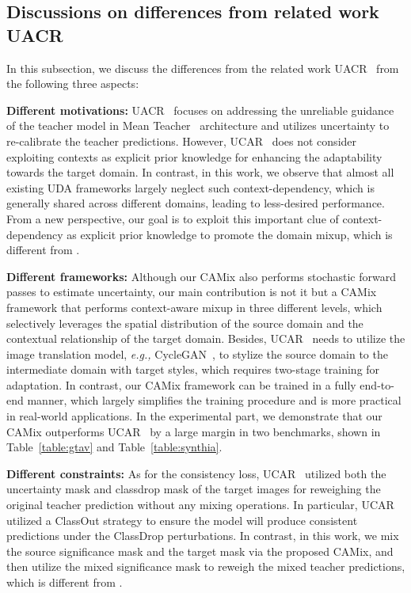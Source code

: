 \documentclass[journal]{IEEEtran}
\begin{document}
{\begin{minipage}{\textwidth}
\subsection{Discussions on differences from 
related work UACR~\cite{zhou2020uncertainty}}
In this subsection, we discuss the differences from the related work UACR~\cite{zhou2020uncertainty} from the following three aspects:

\noindent 
\noindent \textbf{Different motivations:} UACR~\cite{zhou2020uncertainty} focuses on addressing the unreliable guidance of the teacher model in Mean Teacher~\cite{Mean_teacher} architecture and utilizes uncertainty to re-calibrate the teacher predictions. However, UCAR~\cite{zhou2020uncertainty} does not consider exploiting contexts
as explicit prior knowledge for enhancing the adaptability towards the target domain. In contrast, in this work, we observe that almost all existing UDA frameworks largely neglect such context-dependency, which is generally shared across different domains, leading to less-desired performance. From a new perspective, our goal is to exploit this important clue of context-dependency as explicit prior knowledge to promote the domain mixup, which is different from \cite{zhou2020uncertainty}.

\noindent 
\noindent \textbf{Different frameworks:} Although our CAMix also performs stochastic forward passes to estimate uncertainty, our main contribution is not it but a CAMix framework that performs context-aware mixup in three different levels, which selectively leverages the spatial distribution of the source domain and the contextual relationship of the target domain.
Besides, UCAR~\cite{zhou2020uncertainty} needs to utilize the image translation model, \emph{e.g.,} CycleGAN~\cite{CycleGAN2017}, to stylize the source domain to the intermediate domain with target styles, which requires two-stage training for adaptation. In contrast, our CAMix framework can be trained in a fully end-to-end manner, which largely simplifies the training procedure and is more practical in real-world applications. In the experimental part, we demonstrate that our CAMix outperforms UCAR~\cite{zhou2020uncertainty} by a large margin in two benchmarks, shown in Table~\ref{table:gtav} and Table~\ref{table:synthia}.

\noindent 
\noindent \textbf{Different constraints:} As for the consistency loss, UCAR~\cite{zhou2020uncertainty} utilized both the uncertainty mask and classdrop mask of the target images for reweighing the original teacher prediction without any mixing operations. In particular, UCAR~\cite{zhou2020uncertainty} utilized a ClassOut strategy to ensure the model will produce consistent predictions under the ClassDrop perturbations. In contrast, in this work, we mix the source significance mask and the target mask via the proposed CAMix, and then utilize the mixed significance mask to reweigh the mixed teacher predictions, which is different from \cite{zhou2020uncertainty}.


\end{minipage}}
\end{document}
